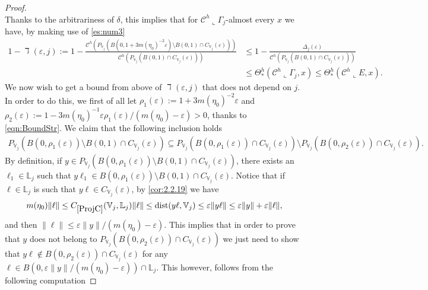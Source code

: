 \documentclass[10pt, a4paper,
oneside, headinclude,footinclude]{scrartcl}
\begin{document}
\begin{proof}
$$$$
Thanks to the arbitrariness of $\delta$, this implies that for $\mathcal{C}^h\llcorner \Gamma_j$-almost every $x$ we have, by making use of \eqref{es:num3}
\begin{equation}
    \begin{split}
        1-\daleth(\varepsilon,j):=1-\frac{\mathcal{C}^h(P_{\mathbb{V}_j}(B(0,1+3 m(\eta_0)^{-2}\varepsilon)\setminus B(0,1)\cap C_{\mathbb{V}_j}(\varepsilon)))}{\mathcal{C}^h(P_{\mathbb V_j}(B(0,1)\cap C_{\mathbb V_j}(\varepsilon)))}&\leq 1-\frac{\Delta_j(\varepsilon)}{\mathcal{C}^h(P_{\mathbb V_j}(B(0,1)\cap C_{\mathbb V_j}(\varepsilon)))}\\
        &\leq \Theta^h_*(\mathcal{C}^h\llcorner \Gamma_j,x)\leq \Theta^h_*(\mathcal{C}^h\llcorner E,x).
        \label{eqn:EquazioneIncriminata}
    \end{split}
\end{equation}
We now wish to get a bound from above of $\daleth(\varepsilon,j)$ that does not depend on $j$. In order to do this, we first of all let $\rho_1(\varepsilon):=1+3 m(\eta_0)^{-2}\varepsilon$ and $\rho_2(\varepsilon):=1-3m(\eta_0)^{-1}\varepsilon\rho_1(\varepsilon)/(m(\eta_0)-\varepsilon)>0$, thanks to \eqref{eqn:BoundStr}.
We claim that the following inclusion holds
\begin{equation}
    \begin{split}
        P_{\mathbb{V}_j}(B(0,\rho_1(\varepsilon))\setminus B(0,1)\cap C_{\mathbb{V}_j}(\varepsilon))
        \subseteq P_{\mathbb{V}_j}(B(0,\rho_1(\varepsilon))\cap C_{\mathbb{V}_j}(\varepsilon))\setminus P_{\mathbb{V}_j}(B(0,\rho_2(\varepsilon))\cap C_{\mathbb{V}_j}(\varepsilon)).
        \label{eq:num4}
    \end{split}
\end{equation}
By definition, if $y\in P_{\mathbb{V}_j}(B(0,\rho_1(\varepsilon))\setminus B(0,1)\cap C_{\mathbb{V}_j}(\varepsilon))$, there exists an $\ell_1\in \mathbb{L}_j$ such that $y\ell_1\in B(0,\rho_1(\varepsilon))\setminus B(0,1)\cap C_{\mathbb{V}_j}(\varepsilon)$. Notice that if $\ell\in \mathbb{L}_j$ is such that $y\ell\in C_{\mathbb{V}_j}(\varepsilon)$, by \cref{cor:2.2.19} we have
$$
m(\eta_0)\lVert \ell\rVert\leq\oldC{ProjC}(\mathbb{V}_j,\mathbb{L}_j)\lVert \ell\rVert\leq\dist(y\ell,\mathbb{V}_j)\leq\varepsilon\lVert y\ell\rVert\leq \varepsilon\lVert y\rVert+\varepsilon\lVert \ell\rVert,
$$
and then $\|\ell\|\leq \varepsilon\|y\|/(m(\eta_0)-\varepsilon)$.
This implies that in order to prove that $y$ does not belong to $P_{\mathbb{V}_j}(B(0,\rho_2(\varepsilon))\cap C_{\mathbb{V}_j}(\varepsilon))$ we just need to show that $y\ell\not \in B(0,\rho_2(\varepsilon))\cap C_{\mathbb{V}_j}(\varepsilon)$ for any $\ell\in B(0,\varepsilon\lVert y\rVert/(m(\eta_0)-\varepsilon))\cap \mathbb{L}_j$. This however, follows from the following computation

\end{proof}
\end{document}
